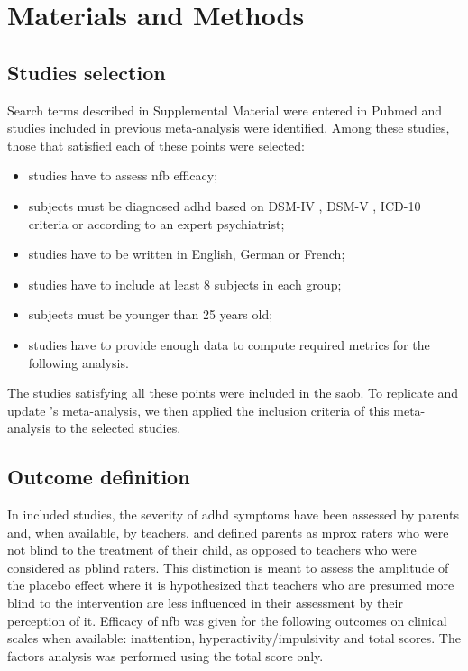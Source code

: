 

\section{Materials and Methods}

\subsection{Studies selection}

Search terms described in Supplemental Material were entered in Pubmed and studies included in previous meta-analysis were identified. Among these studies, those that
satisfied each of these points were selected:
\begin{itemize}
	\item studies have to assess \gls{nfb} efficacy; 
	\item subjects must be diagnosed \gls{adhd} based on DSM-IV \citep{DSM-4}, DSM-V \citep{DSM-5}, ICD-10 \citep{ICD101993} 
	criteria or according to an expert psychiatrist; 
	\item studies have to be written in English, German or French;
	\item studies have to include at least 8 subjects in each group;
	\item subjects must be younger than 25 years old;
	\item studies have to provide enough data to compute required metrics for the following analysis.
\end{itemize} 
The studies satisfying all these points were included in the \gls{saob}. To replicate and update \citeauthor{Cortese2016}'s meta-analysis, we then applied the inclusion 
criteria of this meta-analysis to the selected studies. 

\subsection{Outcome definition} 

In included studies, the severity of \gls{adhd} symptoms have been assessed by parents and, when available, by teachers. \citet{Cortese2016} 
and \citet{Micoulaud2014} defined parents as \gls{mprox} raters who were not blind to the treatment of their child, as opposed to 
teachers who were considered as \gls{pblind} raters. This distinction is meant to assess the amplitude of the placebo effect where 
it is hypothesized that teachers who are presumed more blind to the intervention are less influenced in their assessment by their perception of it. 
Efficacy of \gls{nfb} was given for the following outcomes on clinical scales when available: inattention, 
hyperactivity/impulsivity and total scores. The factors analysis was performed using the total score only.


